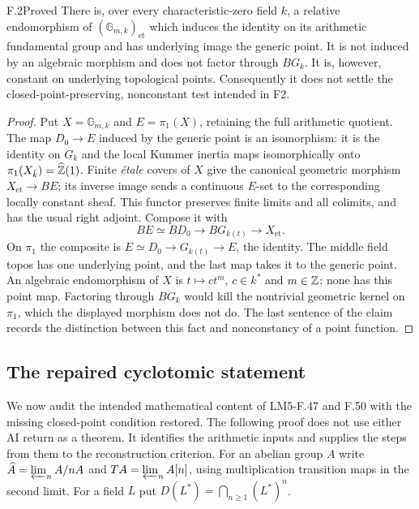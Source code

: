 \begin{claim}{F.2}{Proved}
There is, over every characteristic-zero field $k$, a relative
endomorphism of $(\mathbb G_{m,k})_{\mathrm{et}}$ which induces the
identity on its arithmetic fundamental group and has underlying image
the generic point. It is not induced by an algebraic morphism and does
not factor through $B G_k$. It is, however, constant on underlying
topological points. Consequently it does not settle the
closed-point-preserving, nonconstant test intended in F2.
\end{claim}
\begin{proof}
Put $X=\mathbb G_{m,k}$ and $E=\pi_1(X)$, retaining the full arithmetic
quotient. The map $D_0\to E$ induced by the generic point is an
isomorphism: it is the identity on $G_k$ and the local Kummer inertia
maps isomorphically onto $\pi_1(X_{\bar k})=\widehat{\mathbb Z}(1)$.
Finite \emph{\'etale} covers of $X$ give the canonical geometric
morphism $X_{\mathrm{et}}\to B E$; its inverse image sends a continuous
$E$-set to the corresponding locally constant sheaf. This functor
preserves finite limits and all colimits, and has the usual right
adjoint. Compose it with
\[
B E\simeq B D_0\longrightarrow B G_{k(t)}
 \longrightarrow X_{\mathrm{et}}.
\]
On $\pi_1$ the composite is $E\simeq D_0\to G_{k(t)}\to E$, the
identity. The middle field topos has one underlying point, and the last
map takes it to the generic point. An algebraic endomorphism of $X$ is
$t\mapsto c t^m$, $c\in k^*$ and $m\in\mathbb Z$; none has this point
map. Factoring through $B G_k$ would kill the nontrivial geometric
kernel on $\pi_1$, which the displayed morphism does not do. The last
sentence of the claim records the distinction between this fact and
nonconstancy of a point function.
\end{proof}

\subsection{The repaired cyclotomic statement}

We now audit the intended mathematical content of LM5-F.47 and F.50
with the missing closed-point condition restored. The following proof
does not use either AI return as a theorem. It identifies the arithmetic
inputs and supplies the steps from them to the reconstruction criterion.
For an abelian group $A$ write $\widehat A=\varprojlim_n A/nA$ and
$T A=\varprojlim_n A[n]$, using multiplication transition maps in
the second limit. For a field $L$ put
$D(L^*)=\bigcap_{n\ge1}(L^*)^n$.

